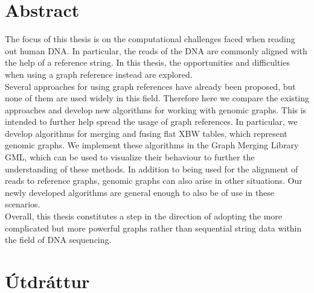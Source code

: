 \documentclass[a4paper,12pt,twoside,BCOR=10mm]{scrbook}
\begin{document}

\setcounter{page}{5}
\section*{\huge Abstract}


The focus of this thesis is on the computational challenges faced when reading out human DNA.
In particular, the reads of the DNA are commonly aligned with the help of a reference string.
In this thesis, the opportunities and difficulties when using a graph reference instead are explored. \\
Several approaches for using graph references have already been proposed,
but none of them are used widely in this field.
Therefore here we compare the existing approaches and
develop new algorithms for working with genomic graphs.
This is intended to further help spread the usage of graph references.
In particular, we develop algorithms for merging
and fusing flat XBW tables, which represent genomic graphs.
We implement these algorithms in the Graph Merging Library GML,
which can be used to visualize their behaviour
to further the understanding of these methods.
In addition to being used for the alignment of reads to reference graphs,
genomic graphs can also arise in other situations.
Our newly developed algorithms are general enough to also be of use in these scenarios. \\
Overall, this thesis constitutes a step in the direction
of adopting the more complicated but more powerful
graphs rather than sequential string data within the field of DNA sequencing.

\vspace*{1cm}
\section*{\huge Útdráttur}

\end{document}
